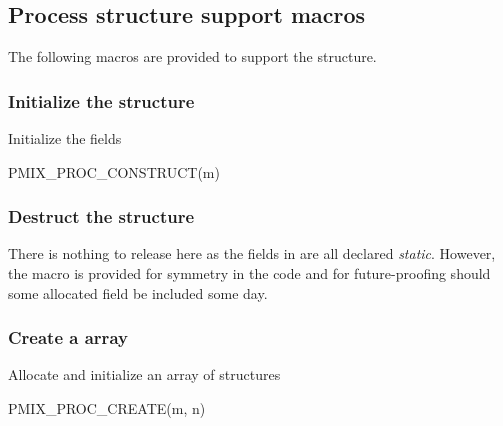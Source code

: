 \subsection{Process structure support macros}
The following macros are provided to support the  structure.

\subsubsection{Initialize the  structure}

Initialize the  fields

\cspecificstart
\begin{codepar}
PMIX_PROC_CONSTRUCT(m)
\end{codepar}
\cspecificend

\begin{arglist}
\end{arglist}

\subsubsection{Destruct the  structure}

There is nothing to release here as the fields in  are all declared \emph{static}. However, the macro is provided for symmetry in the code and for future-proofing should some allocated field be included some day.

\subsubsection{Create a  array}

Allocate and initialize an array of  structures

\cspecificstart
\begin{codepar}
PMIX_PROC_CREATE(m, n)
\end{codepar}
\cspecificend

\begin{arglist}
\end{arglist}


